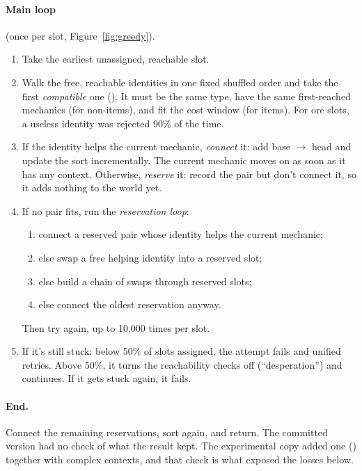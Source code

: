 \paragraph{Main loop} (once per slot, Figure~\ref{fig:greedy}).
\begin{enumerate}
  \item Take the earliest unassigned, reachable slot.
  \item Walk the free, reachable identities in one fixed shuffled order and take the first \emph{compatible} one (). It must be the same type, have the same first-reached mechanics (for non-items), and fit the cost window (for items). For ore slots, a useless identity was rejected 90\% of the time.
  \item If the identity helps the current mechanic, \emph{connect} it: add base $\to$ head and update the sort incrementally. The current mechanic moves on as soon as it has any context. Otherwise, \emph{reserve} it: record the pair but don't connect it, so it adds nothing to the world yet.
  \item If no pair fits, run the \emph{reservation loop}:
  \begin{enumerate}[label=(\alph*)]
    \item connect a reserved pair whose identity helps the current mechanic;
    \item else swap a free helping identity into a reserved slot;
    \item else build a chain of swaps through reserved slots;
    \item else connect the oldest reservation anyway.
  \end{enumerate}
  Then try again, up to 10{,}000 times per slot.
  \item If it's still stuck: below 50\% of slots assigned, the attempt fails and unified retries. Above 50\%, it turns the reachability checks off (``desperation'') and continues. If it gets stuck again, it fails.
\end{enumerate}

\paragraph{End.} Connect the remaining reservations, sort again, and return. The committed version had no check of what the result kept. The experimental copy added one () together with complex contexts, and that check is what exposed the losses below.

